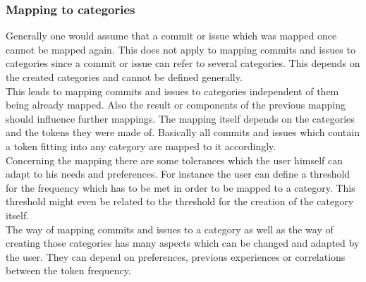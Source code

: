 \subsubsection{Mapping to categories}

Generally one would assume that a commit or issue which was mapped once cannot be mapped again.
This does not apply to mapping commits and issues to categories since a commit or issue can refer to several categories.
This depends on the created categories and cannot be defined generally.\\
This leads to mapping commits and issues to categories independent of them being already mapped.
Also the result or components of the previous mapping should influence further mappings.
The mapping itself depends on the categories and the tokens they were made of.
Basically all commits and issues which contain a token fitting into any category are mapped to it accordingly. \\
Concerning the mapping there are some tolerances which the user himself can adapt to his needs and preferences.
For instance the user can define a threshold for the frequency which has to be met in order to be mapped to a category.
This threshold might even be related to the threshold for the creation of the category itself. \\
The way of mapping commits and issues to a category as well as the way of creating those categories has many aspects which can be changed and adapted by the user.
They can depend on preferences, previous experiences or correlations between the token frequency.

